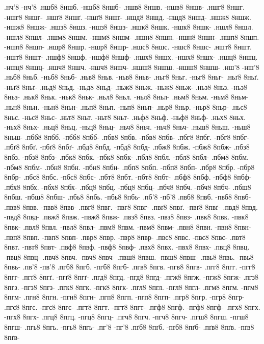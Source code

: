 {%
.нч'8 -нч'8
.ншб8 8ншб. -ншб8 8ншб-
.ншв8 8ншв. -ншв8 8ншв-
.ншг8 8ншг. -ншг8 8ншг-
.ншґ8 8ншґ. -ншґ8 8ншґ-
.ншд8 8ншд. -ншд8 8ншд-
.ншж8 8ншж. -ншж8 8ншж-
.ншз8 8ншз. -ншз8 8ншз-
.ншк8 8ншк. -ншк8 8ншк-
.ншл8 8ншл. -ншл8 8ншл-
.ншм8 8ншм. -ншм8 8ншм-
.ншн8 8ншн. -ншн8 8ншн-
.ншп8 8ншп. -ншп8 8ншп-
.ншр8 8ншр. -ншр8 8ншр-
.ншс8 8ншс. -ншс8 8ншс-
.ншт8 8ншт. -ншт8 8ншт-
.ншф8 8ншф. -ншф8 8ншф-
.ншх8 8ншх. -ншх8 8ншх-
.ншц8 8ншц. -ншц8 8ншц-
.ншч8 8ншч. -ншч8 8ншч-
.ншш8 8ншш. -ншш8 8ншш-
.нш'8 -нш'8
.ньб8 8ньб. -ньб8 8ньб-
.ньв8 8ньв. -ньв8 8ньв-
.ньг8 8ньг. -ньг8 8ньг-
.ньґ8 8ньґ. -ньґ8 8ньґ-
.ньд8 8ньд. -ньд8 8ньд-
.ньж8 8ньж. -ньж8 8ньж-
.ньз8 8ньз. -ньз8 8ньз-
.ньк8 8ньк. -ньк8 8ньк-
.ньл8 8ньл. -ньл8 8ньл-
.ньм8 8ньм. -ньм8 8ньм-
.ньн8 8ньн. -ньн8 8ньн-
.ньп8 8ньп. -ньп8 8ньп-
.ньр8 8ньр. -ньр8 8ньр-
.ньс8 8ньс. -ньс8 8ньс-
.ньт8 8ньт. -ньт8 8ньт-
.ньф8 8ньф. -ньф8 8ньф-
.ньх8 8ньх. -ньх8 8ньх-
.ньц8 8ньц. -ньц8 8ньц-
.ньч8 8ньч. -ньч8 8ньч-
.ньш8 8ньш. -ньш8 8ньш-
.пбб8 8пбб. -пбб8 8пбб-
.пбв8 8пбв. -пбв8 8пбв-
.пбг8 8пбг. -пбг8 8пбг-
.пбґ8 8пбґ. -пбґ8 8пбґ-
.пбд8 8пбд. -пбд8 8пбд-
.пбж8 8пбж. -пбж8 8пбж-
.пбз8 8пбз. -пбз8 8пбз-
.пбк8 8пбк. -пбк8 8пбк-
.пбл8 8пбл. -пбл8 8пбл-
.пбм8 8пбм. -пбм8 8пбм-
.пбн8 8пбн. -пбн8 8пбн-
.пбп8 8пбп. -пбп8 8пбп-
.пбр8 8пбр. -пбр8 8пбр-
.пбс8 8пбс. -пбс8 8пбс-
.пбт8 8пбт. -пбт8 8пбт-
.пбф8 8пбф. -пбф8 8пбф-
.пбх8 8пбх. -пбх8 8пбх-
.пбц8 8пбц. -пбц8 8пбц-
.пбч8 8пбч. -пбч8 8пбч-
.пбш8 8пбш. -пбш8 8пбш-
.пбь8 8пбь. -пбь8 8пбь-
.пб'8 -пб'8
.пвб8 8пвб. -пвб8 8пвб-
.пвв8 8пвв. -пвв8 8пвв-
.пвг8 8пвг. -пвг8 8пвг-
.пвґ8 8пвґ. -пвґ8 8пвґ-
.пвд8 8пвд. -пвд8 8пвд-
.пвж8 8пвж. -пвж8 8пвж-
.пвз8 8пвз. -пвз8 8пвз-
.пвк8 8пвк. -пвк8 8пвк-
.пвл8 8пвл. -пвл8 8пвл-
.пвм8 8пвм. -пвм8 8пвм-
.пвн8 8пвн. -пвн8 8пвн-
.пвп8 8пвп. -пвп8 8пвп-
.пвр8 8пвр. -пвр8 8пвр-
.пвс8 8пвс. -пвс8 8пвс-
.пвт8 8пвт. -пвт8 8пвт-
.пвф8 8пвф. -пвф8 8пвф-
.пвх8 8пвх. -пвх8 8пвх-
.пвц8 8пвц. -пвц8 8пвц-
.пвч8 8пвч. -пвч8 8пвч-
.пвш8 8пвш. -пвш8 8пвш-
.пвь8 8пвь. -пвь8 8пвь-
.пв'8 -пв'8
.пгб8 8пгб. -пгб8 8пгб-
.пгв8 8пгв. -пгв8 8пгв-
.пгг8 8пгг. -пгг8 8пгг-
.пгґ8 8пгґ. -пгґ8 8пгґ-
.пгд8 8пгд. -пгд8 8пгд-
.пгж8 8пгж. -пгж8 8пгж-
.пгз8 8пгз. -пгз8 8пгз-
.пгк8 8пгк. -пгк8 8пгк-
.пгл8 8пгл. -пгл8 8пгл-
.пгм8 8пгм. -пгм8 8пгм-
.пгн8 8пгн. -пгн8 8пгн-
.пгп8 8пгп. -пгп8 8пгп-
.пгр8 8пгр. -пгр8 8пгр-
.пгс8 8пгс. -пгс8 8пгс-
.пгт8 8пгт. -пгт8 8пгт-
.пгф8 8пгф. -пгф8 8пгф-
.пгх8 8пгх. -пгх8 8пгх-
.пгц8 8пгц. -пгц8 8пгц-
.пгч8 8пгч. -пгч8 8пгч-
.пгш8 8пгш. -пгш8 8пгш-
.пгь8 8пгь. -пгь8 8пгь-
.пг'8 -пг'8
.пґб8 8пґб. -пґб8 8пґб-
.пґв8 8пґв. -пґв8 8пґв-
}
